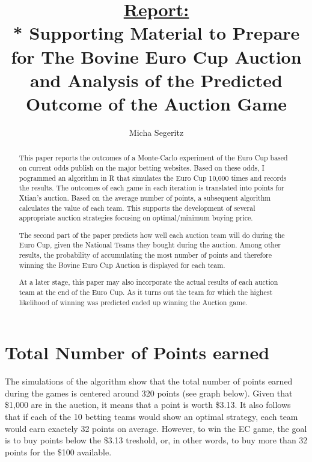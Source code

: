 \documentclass{article}\usepackage[]{graphicx}\usepackage[]{color}
\begin{document}
\title{\underline{Report:}\\* Supporting Material to Prepare for The Bovine Euro Cup Auction\texttrademark{ } and Analysis of the Predicted Outcome of the Auction Game}
\author{Micha Segeritz}
\maketitle

\begin{abstract}
This paper reports the outcomes of a Monte-Carlo experiment of the Euro Cup based on current odds publish on the major betting websites. Based on these odds, I pogrammed an algorithm in R that simulates the Euro Cup 10,000 times and records the results. The outcomes of each game in each iteration is translated into points for Xtian's auction. Based on the average number of points, a subsequent algorithm calculates the value of each team. This supports the development of several appropriate auction strategies focusing on optimal/minimum buying price.

The second part of the paper predicts how well each auction team will do during the Euro Cup, given the National Teams they bought during the auction. Among other results, the probability of accumulating the most number of points and therefore winning the Bovine Euro Cup Auction\texttrademark{ } is displayed for each team.

At a later stage, this paper may also incorporate the actual results of each auction team at the end of the Euro Cup. As it turns out the team for which the highest likelihood of winning was predicted ended up winning the Auction game.
\end{abstract}








\section{Total Number of Points earned}

The simulations of the algorithm show that the total number of points earned during the games is centered around 320 points (see graph below). Given that \$1,000 are in the auction, it means that a point is worth \$3.13. It also follows that if each of the 10 betting teams would show an optimal strategy, each team would earn exactely 32 points on average.  However, to win the EC game, the goal is to buy points below the \$3.13 treshold, or, in other words, to buy more than 32 points for the \$100 available.
\end{document}
